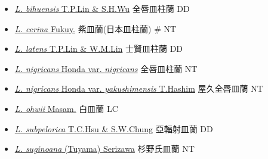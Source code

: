 \begin{itemize}
  \begin{itemize}
        \item[] \href{http://www.theplantlist.org/tpl1.1/search?q=Lecanorchis+bihuensis}{\textit{L. bihuensis} T.P.Lin \& S.H.Wu}   全唇皿柱蘭 DD
        \item[] \href{http://www.theplantlist.org/tpl1.1/search?q=Lecanorchis+cerina}{\textit{L. cerina} Fukuy.}     紫皿蘭(日本皿柱蘭)  \# NT
        \item[] \href{http://www.theplantlist.org/tpl1.1/search?q=Lecanorchis+latens}{\textit{L. latens} T.P.Lin \& W.M.Lin}   士賢皿柱蘭 DD
        \item[] \href{http://www.theplantlist.org/tpl1.1/search?q=Lecanorchis+nigricans+var.+nigricans}{\textit{L. nigricans} Honda var. \textit{nigricans}}   全唇皿柱蘭 NT
        \item[] \href{http://www.theplantlist.org/tpl1.1/search?q=Lecanorchis+nigricans+var.+yakushimensis}{\textit{L. nigricans} Honda var. \textit{yakushimensis} T.Hashim}   屋久全唇皿蘭 NT
        \item[] \href{http://www.theplantlist.org/tpl1.1/search?q=Lecanorchis+ohwii}{\textit{L. ohwii} Masam.}     白皿蘭 LC
        \item[] \href{http://www.theplantlist.org/tpl1.1/search?q=Lecanorchis+subpelorica}{\textit{L. subpelorica} T.C.Hsu \& S.W.Chung}   亞輻射皿蘭 DD
        \item[] \href{http://www.theplantlist.org/tpl1.1/search?q=Lecanorchis+suginoana}{\textit{L. suginoana} (Tuyama) Serizawa}   杉野氏皿蘭 NT

\end{itemize}
\end{itemize}

